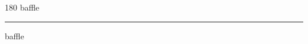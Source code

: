 
\begin{frame}
\begin{center}
\begin{turn}{180}
{\fontsize{2.5cm}{1em}\selectfont baffle}
\end{turn}
\vspace{1em}\par  
\hrule
\vspace{1em}\par  
{\fontsize{2.5cm}{1em}\selectfont baffle}
\end{center}
\end{frame}
